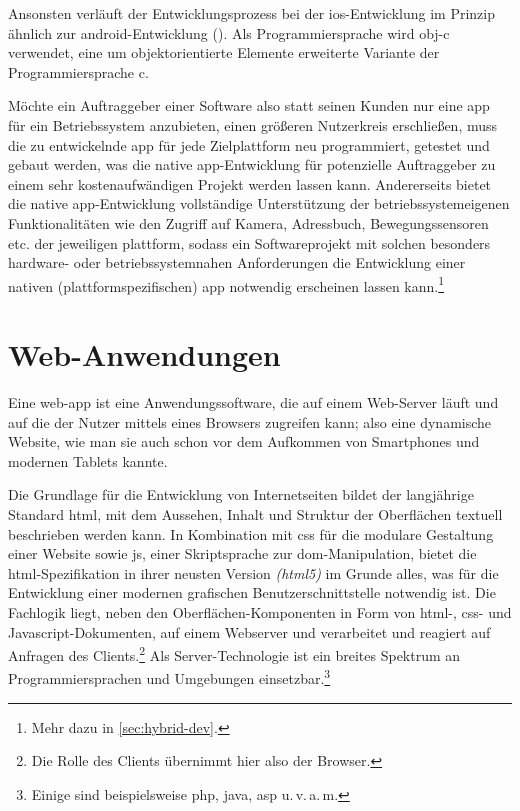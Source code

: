 Ansonsten verläuft der Entwicklungsprozess bei der \gls{ios}-Entwicklung im Prinzip ähnlich zur \gls{android}-Entwicklung ().
Als Programmiersprache wird \gls{obj-c} verwendet, eine um objektorientierte Elemente erweiterte Variante der Programmiersprache \gls{c}.

Möchte ein Auftraggeber einer Software also statt seinen Kunden nur eine \gls{app} für ein Betriebssystem anzubieten, einen größeren Nutzerkreis erschließen, muss die zu entwickelnde \gls{app} für jede Zielplattform neu programmiert, getestet und gebaut werden, was die native \gls{app}-Entwicklung für potenzielle Auftraggeber zu einem sehr kostenaufwändigen Projekt werden lassen kann.
Andererseits bietet die native \gls{app}-Entwicklung vollständige Unterstützung der betriebssystemeigenen Funktionalitäten wie den Zugriff auf Kamera, Adressbuch, Bewegungssensoren etc. der jeweiligen \gls{plattform}, sodass ein Softwareprojekt mit solchen besonders hardware- oder betriebssystemnahen Anforderungen die Entwicklung einer nativen (plattformspezifischen) \gls{app} notwendig erscheinen lassen kann.\footnote{Mehr dazu in \autoref{sec:hybrid-dev}.}

\section{Web-Anwendungen}\label{sec:web-app}

Eine \gls{web-app} ist eine Anwendungssoftware, die auf einem Web-Server läuft und auf die der Nutzer mittels eines Browsers zugreifen kann; also eine dynamische Website, wie man sie auch schon vor dem Aufkommen von Smartphones und modernen Tablets kannte. 

Die Grundlage für die Entwicklung von Internetseiten bildet der langjährige Standard \gls{html}, mit dem Aussehen, Inhalt und Struktur der Oberflächen textuell beschrieben werden kann. 
In Kombination mit \gls{css} für die modulare Gestaltung einer Website sowie \gls{js}, einer Skriptsprache zur \gls{dom}-Manipulation, bietet die \gls{html}-Spezifikation in ihrer neusten Version \textit{(\gls{html5})} im Grunde alles, was für die Entwicklung einer modernen grafischen Benutzerschnittstelle notwendig ist. 
Die Fachlogik liegt, neben den Oberflächen-Komponenten in Form von \mbox{\gls{html}-,} \gls{css}- und Javascript-Dokumenten, auf einem Webserver und verarbeitet und reagiert auf Anfragen des Clients.\footnote{Die Rolle des Clients übernimmt hier also der Browser.}
Als Server-Technologie ist ein breites Spektrum an Programmiersprachen und Umgebungen einsetzbar.\footnote{Einige sind beispielsweise \gls*{php}, \gls*{java}, \gls*{asp} u.\,v.\,a.\,m.}

